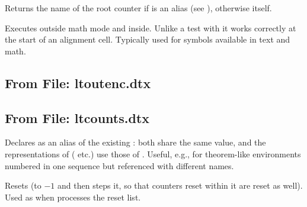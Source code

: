 \documentclass{l3in2edoc}
\begin{document}
\begin{function}[int]
  {
    \@kernel@get@ctr@root
  }
  \begin{syntax}
     
  \end{syntax}
  Returns the name of the root counter if  is an alias
  (see ), otherwise  itself.
\end{function}




\begin{function}[user]
  {
    \TextOrMath
  }
  \begin{syntax}
      
  \end{syntax}
  Executes  outside math mode and 
  inside. Unlike a test with  it works correctly at the
  start of an alignment cell. Typically used for symbols available in
  text and math.
\end{function}




\subsection{From File: ltoutenc.dtx}

\leavevmode


\subsection{From File: ltcounts.dtx}


\begin{function}[]
  {
    \newcounteralias
  }
  \begin{syntax}
      
  \end{syntax}
  Declares  as an alias of the existing :
  both share the same value, and the representations of 
  ( etc.) use those of . Useful,
  e.g., for theorem-like environments numbered in one sequence
  but referenced with different names.
\end{function}




\begin{function}[]
  {
    \@stpelt
  }
  \begin{syntax}
     
  \end{syntax}
  Resets  (to $-1$ and then steps it, so that counters
  reset within it are reset as well). Used as  when
   processes the reset list.
\end{function}
\end{document}
